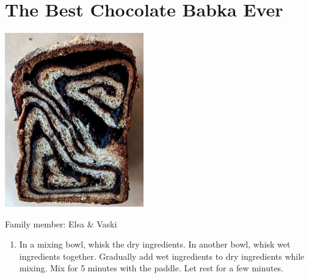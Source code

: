 \chapter{The Best Chocolate Babka Ever}
\label{ch:babka}


\begin{marginfigure}[20pt]
  \includegraphics[width=60mm]{velsa/images/Babka.png}
\end{marginfigure}

Family member: Elsa \& Vaski

\begin{enumerate}
    \item  In a mixing bowl, whisk the dry ingredients. In another bowl, whisk wet ingredients together. Gradually add wet ingredients to dry ingredients while mixing. Mix for 5 minutes with the paddle. Let rest for a few minutes.

\end{enumerate}

